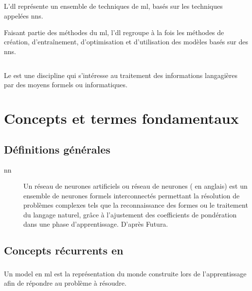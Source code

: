 \subsection{} \label{subsec:dl}\label{def:dl}
L'\gls{dl} représente un ensemble de techniques de \gls{ml}, basés sur les techniques appelées \glspl{nn}.

Faisant partie des méthodes du \gls{ml}, l'\gls{dl} regroupe à la fois les méthodes de création, d'entraînement, d'optimisation et d'utilisation des modèles basés sur des \glspl{nn}.

\subsection{} \label{subsec:nlp}\label{def:nlp}
Le  est une discipline qui s'intéresse au traitement des informations langagières par des moyens formels ou informatiques.

\section{Concepts et termes fondamentaux} %
\subsection{Définitions générales}
\begin{description}
	\item[\Gls{nn}\label{def:nn}]
	Un réseau de neurones artificiels ou réseau de neurones ( en anglais) est un \og ensemble de neurones formels interconnectés permettant la résolution de problèmes complexes tels que la reconnaissance des formes ou le traitement du langage naturel, grâce à l'ajustement des coefficients de pondération dans une phase d'apprentissage.\fg{} D'après Futura.
	
\end{description}

\subsection{Concepts récurrents en }
\subsubsection{\label{def:model}}
Un \gls{model} en \gls{ml} est la représentation du monde construite lors de l'apprentissage afin de répondre au problème à résoudre.

